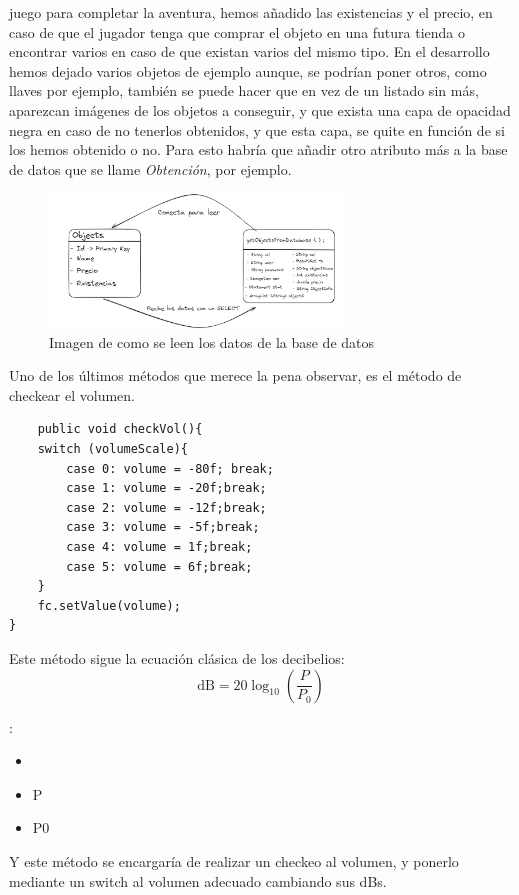 \documentclass[a4paper]{article}
\begin{document}
juego para completar la aventura, hemos añadido las existencias y el precio, en caso de que el jugador tenga que comprar el objeto en una futura tienda o encontrar varios en caso de que existan varios del mismo tipo.
En el desarrollo hemos dejado varios objetos de ejemplo aunque, se podrían poner otros, como llaves por ejemplo, también se puede hacer que en vez de un listado sin más, aparezcan imágenes de los objetos a conseguir, y que exista una capa de opacidad negra en caso de no tenerlos obtenidos,
y que esta capa, se quite en función de si los hemos obtenido o no. Para esto habría que añadir otro atributo más a la base de datos que se llame \textit{Obtención}, por ejemplo.\\
\begin{figure}[!ht]
    \centering
    \includegraphics[width=0.7\textwidth]{Images/diagramabasededatoscomo.PNG}
    \caption{Imagen de como se leen los datos de la base de datos}
    \label{fig:diagramaBasededatosC}
\end{figure}
\clearpage
Uno de los últimos métodos que merece la pena observar, es el método de checkear el volumen.
\begin{lstlisting}
    public void checkVol(){
    switch (volumeScale){
        case 0: volume = -80f; break;
        case 1: volume = -20f;break;
        case 2: volume = -12f;break;
        case 3: volume = -5f;break;
        case 4: volume = 1f;break;
        case 5: volume = 6f;break;
    }
    fc.setValue(volume);
}
\end{lstlisting}
Este método sigue la ecuación clásica de los decibelios:\\
\[
    \text{dB} = 20 \log_{10} \left( \frac{P}{P_0} \right)
\]

:

\begin{itemize}
    \item {} 
    \item P 
    \item P0 
\end{itemize}
Y este método se encargaría de realizar un checkeo al volumen, y ponerlo mediante un switch al volumen adecuado cambiando sus dBs.
\end{document}
